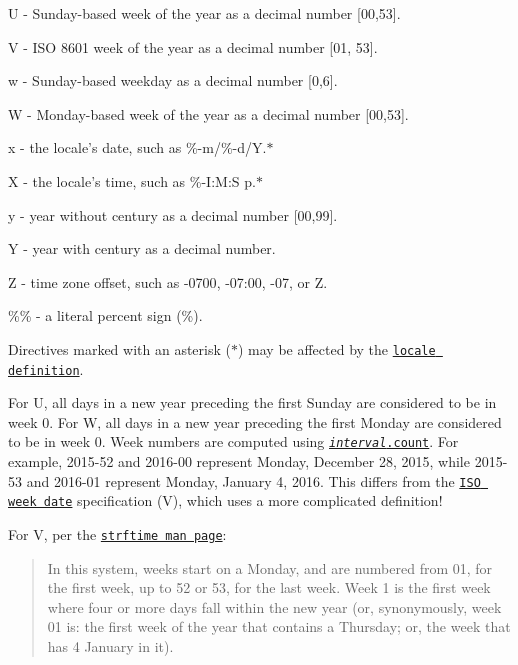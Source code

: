 \begin{DoxyItemize}
\item {\ttfamily U} -\/ Sunday-\/based week of the year as a decimal number \mbox{[}00,53\mbox{]}.
\item {\ttfamily V} -\/ I\+SO 8601 week of the year as a decimal number \mbox{[}01, 53\mbox{]}.
\item {\ttfamily w} -\/ Sunday-\/based weekday as a decimal number \mbox{[}0,6\mbox{]}.
\item {\ttfamily W} -\/ Monday-\/based week of the year as a decimal number \mbox{[}00,53\mbox{]}.
\item {\ttfamily x} -\/ the locale’s date, such as {\ttfamily \%-\/m/\%-\/d/Y}.$\ast$
\item {\ttfamily X} -\/ the locale’s time, such as {\ttfamily \%-\/I\+:M\+:S p}.$\ast$
\item {\ttfamily y} -\/ year without century as a decimal number \mbox{[}00,99\mbox{]}.
\item {\ttfamily Y} -\/ year with century as a decimal number.
\item {\ttfamily Z} -\/ time zone offset, such as {\ttfamily -\/0700}, {\ttfamily -\/07\+:00}, {\ttfamily -\/07}, or {\ttfamily Z}.
\item {\ttfamily \%\%} -\/ a literal percent sign ({\ttfamily \%}).
\end{DoxyItemize}

Directives marked with an asterisk ($\ast$) may be affected by the \href{#localeFormat}{\tt locale definition}.

For {\ttfamily U}, all days in a new year preceding the first Sunday are considered to be in week 0. For {\ttfamily W}, all days in a new year preceding the first Monday are considered to be in week 0. Week numbers are computed using \href{https://github.com/d3/d3-time/blob/master/README.md#interval_count}{\tt {\itshape interval}.count}. For example, 2015-\/52 and 2016-\/00 represent Monday, December 28, 2015, while 2015-\/53 and 2016-\/01 represent Monday, January 4, 2016. This differs from the \href{https://en.wikipedia.org/wiki/ISO_week_date}{\tt I\+SO week date} specification ({\ttfamily V}), which uses a more complicated definition!

For {\ttfamily V}, per the \href{http://man7.org/linux/man-pages/man3/strftime.3.html}{\tt strftime man page}\+:

\begin{quote}
In this system, weeks start on a Monday, and are numbered from 01, for the first week, up to 52 or 53, for the last week. Week 1 is the first week where four or more days fall within the new year (or, synonymously, week 01 is\+: the first week of the year that contains a Thursday; or, the week that has 4 January in it). \end{quote}


